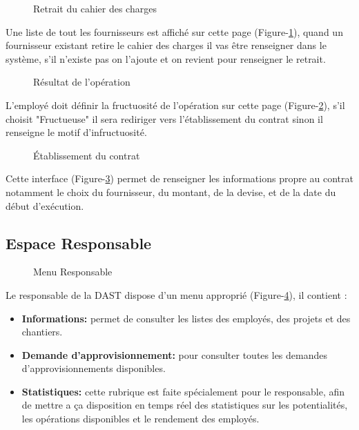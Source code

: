 \documentclass{report}
\begin{document}
\newpage
\begin{figure}[h]
        \centering
        \caption{Retrait du cahier des charges}
        \label{10}
\end{figure}
Une liste de tout les fournisseurs est affiché sur cette page (Figure-\ref{10}), quand un fournisseur existant retire le cahier des charges il vas être renseigner dans le système, s'il n'existe pas on l'ajoute et on revient pour renseigner le retrait.

\vspace{0.4cm}
\begin{figure}[h]
        \centering
        \caption{Résultat de l'opération}
        \label{11}
\end{figure}
L'employé doit définir la fructuosité de l’opération sur cette page (Figure-\ref{11}), s'il choisit "Fructueuse" il sera rediriger vers l’établissement du contrat sinon il renseigne le motif d'infructuosité.

\newpage
\begin{figure}[h]
        \centering
        \caption{Établissement du contrat}
        \label{12}
\end{figure}
\vspace{0.2cm}
Cette interface (Figure-\ref{12}) permet de renseigner les informations propre au contrat notamment le choix du fournisseur, du montant, de la devise, et de la date du début d’exécution.
\subsection{Espace Responsable}
\begin{figure}[h]
        \centering
        \caption{Menu Responsable}
        \label{13}
\end{figure}
Le responsable de la DAST dispose d'un menu approprié (Figure-\ref{13}), il contient :
\begin{itemize}
    \item \textbf{Informations:} permet de consulter les listes des employés, des projets et des chantiers.
    \item \textbf{Demande d'approvisionnement:} pour consulter toutes les demandes d'approvisionnements disponibles.
    \item \textbf{Statistiques:} cette rubrique est faite spécialement pour le responsable, afin de mettre a ça disposition en temps réel des statistiques sur les potentialités, les opérations disponibles et le rendement des employés.
\end{itemize}
\end{document}
